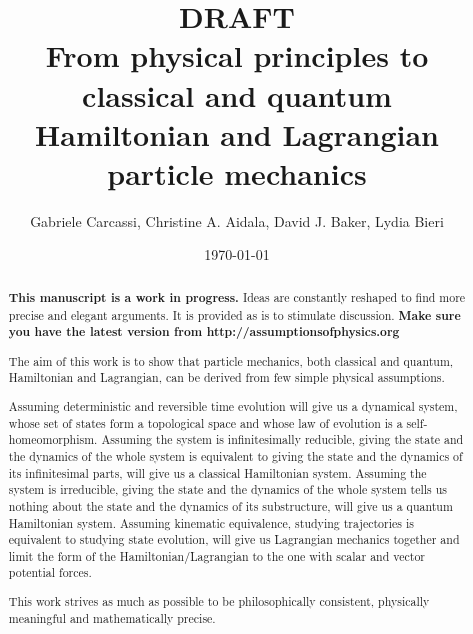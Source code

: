 \documentclass[smallextended]{svjour3}
\numberwithin{equation}{section}
\begin{document}
\title{DRAFT \\ From physical principles to classical and quantum \\ Hamiltonian and Lagrangian particle mechanics}
\author{Gabriele Carcassi, Christine A. Aidala, David J. Baker, Lydia Bieri}



\date{\today}

\maketitle
	
\begin{abstract}
\textbf{This manuscript is a work in progress.} Ideas are constantly reshaped to find more precise and elegant arguments. It is provided as is to stimulate discussion.  \textbf{Make sure you have the latest version from http://assumptionsofphysics.org}

The aim of this work is to show that particle mechanics, both classical and quantum, Hamiltonian and Lagrangian, can be derived from few simple physical assumptions.

Assuming deterministic and reversible time evolution will give us a dynamical system, whose set of states form a topological space and whose law of evolution is a self-homeomorphism. Assuming the system is infinitesimally reducible, giving the state and the dynamics of the whole system is equivalent to giving the state and the dynamics of its infinitesimal parts, will give us a classical Hamiltonian system. Assuming the system is irreducible, giving the state and the dynamics of the whole system tells us nothing about the state and the dynamics of its substructure, will give us a quantum Hamiltonian system. Assuming kinematic equivalence, studying trajectories is equivalent to studying state evolution, will give us Lagrangian mechanics together and limit the form of the Hamiltonian/Lagrangian to the one with scalar and vector potential forces.

This work strives as much as possible to be philosophically consistent, physically meaningful and mathematically precise.
\end{abstract}
\end{document}
